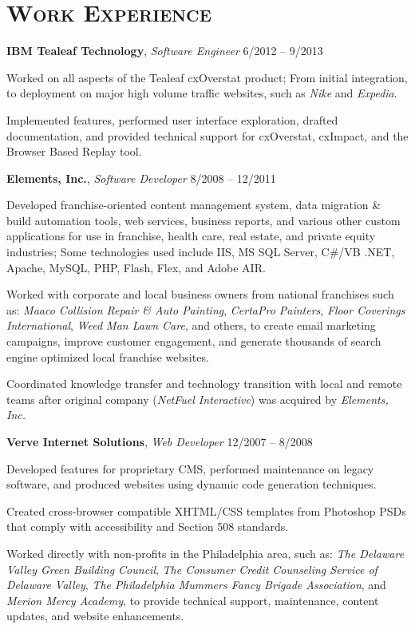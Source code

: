 \documentclass[12pt,a4paper]{article}
\newcommand{\sectionhead}{\normalfont\normalsize\scshape}
\newcommand{\workhead}[3]{\textbf{#1}, \emph{#2} \hfill #3}
\newcommand{\li}{\item[--]}
\begin{document}
\section*{\sectionhead Work Experience}
\begin{description}[leftmargin=0em] 
    \itemsep0pt
    \parskip3pt
    \item 
        \workhead{IBM Tealeaf Technology}{Software Engineer}{6/2012 -- 9/2013}
        \begin{itemize*}
            \li Worked on all aspects of the Tealeaf cxOverstat product; From initial integration, to deployment on major high volume traffic websites, such as \emph{Nike} and \emph{Expedia}.
            \li Implemented features, performed user interface exploration, drafted documentation, and provided technical support for cxOverstat, cxImpact, and the Browser Based Replay tool.
        \end{itemize*}

    \item 
        \workhead{Elements, Inc.}{Software Developer}{8/2008 -- 12/2011}
        \begin{itemize*}
            \li Developed franchise-oriented content management system, data migration \& build automation tools, web services, business reports, and various other custom applications for use in franchise, health care, real estate, and private equity industries; Some technologies used include IIS, MS SQL Server, C\#/VB .NET, Apache, MySQL, PHP, Flash, Flex, and Adobe AIR.
            \li Worked with corporate and local business owners from national franchises such as: \emph{Maaco Collision Repair \& Auto Painting}, \emph{CertaPro Painters}, \emph{Floor Coverings International}, \emph{Weed Man Lawn Care}, and others, to create email marketing campaigns, improve customer engagement, and generate thousands of search engine optimized local franchise websites.
            \li Coordinated knowledge transfer and technology transition with local and remote teams after original company (\emph{NetFuel Interactive}) was acquired by \emph{Elements, Inc.}
        \end{itemize*}

    \item 
        \workhead{Verve Internet Solutions}{Web Developer}{12/2007 -- 8/2008}
        \begin{itemize*}
            \li Developed features for proprietary CMS, performed maintenance on legacy software, and produced websites using dynamic code generation techniques.
            \li Created cross-browser compatible XHTML/CSS templates from Photoshop PSDs that comply with accessibility and Section 508 standards.
            \li Worked directly with non-profits in the Philadelphia area, such as: \emph{The Delaware Valley Green Building Council}, \emph{The Consumer Credit Counseling Service of Delaware Valley}, \emph{The Philadelphia Mummers Fancy Brigade Association}, and \emph{Merion Mercy Academy}, to provide technical support, maintenance, content updates, and website enhancements.
        \end{itemize*}


\end{description}
\end{document}
